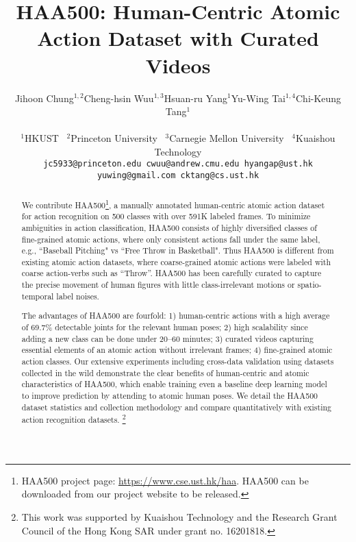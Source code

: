 \documentclass[10pt,twocolumn,letterpaper]{article}
\newcommand\blfootnote[1]{\begingroup
  \renewcommand\thefootnote{}\footnote{#1}\addtocounter{footnote}{-1}\endgroup
}
\begin{document}
\title{HAA500: Human-Centric Atomic Action Dataset with Curated Videos}

\author{
\begin{tabular}{ccccc}
Jihoon Chung$^{1,2}$ & Cheng-hsin Wuu$^{1,3}$ & Hsuan-ru Yang$^1$ & Yu-Wing Tai$^{1,4}$ & Chi-Keung Tang$^1$
\end{tabular}
\\
$^1$HKUST~ $^2$Princeton University~ $^3$Carnegie Mellon University~ $^4$Kuaishou Technology
\\
{\tt\small jc5933@princeton.edu cwuu@andrew.cmu.edu hyangap@ust.hk yuwing@gmail.com cktang@cs.ust.hk}
}

\maketitle
\ificcvfinal\thispagestyle{empty}\fi

\begin{abstract}
We contribute HAA500\footnote{
    \ificcvfinal
        HAA500 project page: {\footnotesize \url{https://www.cse.ust.hk/haa}}.
    \else
        HAA500 can be downloaded from our project website to be released.
    \fi}, a manually annotated human-centric atomic action
dataset for action recognition on 500 classes with over 591K labeled frames. To minimize ambiguities in action classification, HAA500 consists of  highly diversified classes of fine-grained atomic actions, where only consistent actions fall under the same label, e.g., ``Baseball Pitching" vs ``Free Throw in Basketball".  Thus HAA500 is different from existing
atomic action datasets, where coarse-grained atomic actions were labeled with coarse action-verbs such as ``Throw''. HAA500 has been carefully curated to capture the precise movement of human figures with little class-irrelevant motions or spatio-temporal label noises.

The advantages of HAA500 are fourfold: 1) human-centric actions with a high
average of 69.7\% detectable joints for the relevant human poses; 
2) high scalability since adding a new class 
can be done under 20--60 minutes;
3) curated videos capturing essential elements of an atomic
action without irrelevant frames;
4) fine-grained atomic action classes.
Our extensive experiments including cross-data validation using
datasets collected in the wild demonstrate the clear benefits
of human-centric and atomic characteristics of HAA500, which enable training even a baseline deep learning model to improve prediction by attending to atomic human poses.  We detail the HAA500 dataset statistics and collection methodology
and compare quantitatively with existing action recognition datasets.
\blfootnote{This work was supported by Kuaishou Technology and the
Research Grant Council of the Hong Kong SAR under grant no. 16201818.}
\end{abstract}
\end{document}

